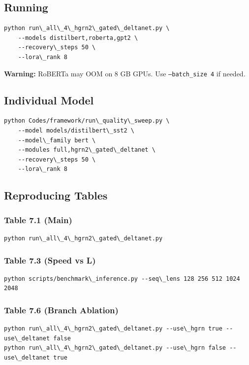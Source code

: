 \subsection{Running}

\begin{lstlisting}
python run\_all\_4\_hgrn2\_gated\_deltanet.py \
    --models distilbert,roberta,gpt2 \
    --recovery\_steps 50 \
    --lora\_rank 8
\end{lstlisting}

\textbf{Warning:} RoBERTa may OOM on 8 GB GPUs. Use \texttt{--batch\_size 4} if needed.

\subsection{Individual Model}

\begin{lstlisting}
python Codes/framework/run\_quality\_sweep.py \
    --model models/distilbert\_sst2 \
    --model\_family bert \
    --modules full,hgrn2\_gated\_deltanet \
    --recovery\_steps 50 \
    --lora\_rank 8
\end{lstlisting}

\subsection{Reproducing Tables}

\subsubsection{Table 7.1 (Main)}
\begin{lstlisting}
python run\_all\_4\_hgrn2\_gated\_deltanet.py
\end{lstlisting}

\subsubsection{Table 7.3 (Speed vs L)}
\begin{lstlisting}
python scripts/benchmark\_inference.py --seq\_lens 128 256 512 1024 2048
\end{lstlisting}

\subsubsection{Table 7.6 (Branch Ablation)}
\begin{lstlisting}
python run\_all\_4\_hgrn2\_gated\_deltanet.py --use\_hgrn true --use\_deltanet false
python run\_all\_4\_hgrn2\_gated\_deltanet.py --use\_hgrn false --use\_deltanet true
\end{lstlisting}

